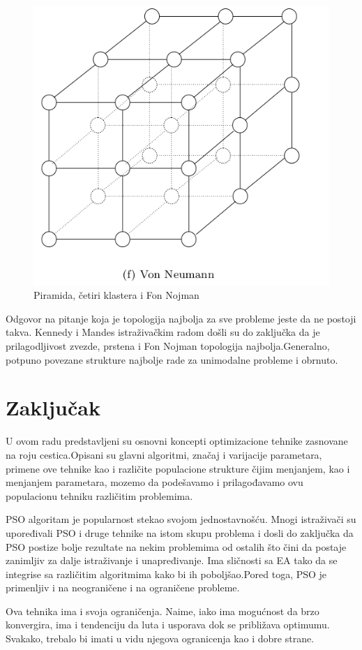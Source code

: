 \documentclass[a4paper]{article}
\begin{document}
\begin{figure}[htp]
    \includegraphics[scale=0.2]{VonNeumann.png}
    \caption{Piramida, četiri klastera i Fon Nojman}
    \label{fig:PiramidaCetiriKlasteraFonNojman}
\end{figure}
Odgovor na pitanje koja je topologija najbolja za sve probleme jeste da ne postoji takva.
Kennedy i Mandes istraživačkim radom došli su do zaključka da je prilagodljivost zvezde, prstena i Fon Nojman topologija najbolja.Generalno, potpuno povezane strukture najbolje rade za unimodalne probleme i obrnuto.


\section{Zaključak}
U ovom radu predstavljeni su osnovni koncepti optimizacione tehnike zasnovane na roju cestica.Opisani su glavni algoritmi, značaj i varijacije parametara, primene ove tehnike kao i različite populacione strukture čijim menjanjem, kao i menjanjem parametara, mozemo da podešavamo i prilagođavamo ovu populacionu tehniku različitim problemima.

PSO algoritam je popularnost stekao svojom jednostavnošću. Mnogi istraživači su upoređivali PSO i druge tehnike na istom skupu problema i dosli do zaključka da PSO postize bolje rezultate na nekim problemima od ostalih što čini da postaje zanimljiv za dalje istraživanje i unapređivanje. Ima sličnosti sa EA tako da se integrise sa različitim algoritmima kako bi ih poboljšao.Pored toga, PSO je primenljiv i na neograničene i na ograničene probleme.

Ova tehnika ima i svoja ograničenja. Naime, iako ima mogućnost da brzo konvergira, ima i tendenciju da luta i usporava dok se približava optimumu. Svakako, trebalo bi imati u vidu njegova ogranicenja kao i dobre strane.


\appendix
 

\end{document}

